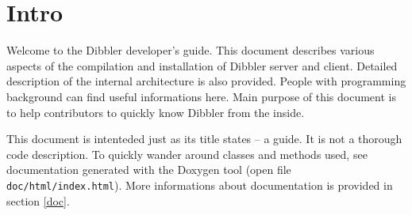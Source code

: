 
\section{Intro}
Welcome to the Dibbler developer's guide. This document describes
various aspects of the compilation and installation of Dibbler server
and client. Detailed description of the internal architecture is also
provided. People with programming background can find useful
informations here. Main purpose of this document is to help
contributors to quickly know Dibbler from the inside.

This document is intenteded just as its title states -- a guide. It is
not a thorough code description. To quickly wander around classes and
methods used, see documentation generated with the Doxygen tool (open
file \verb+doc/html/index.html+). More informations about
documentation is provided in section \ref{doc}.
